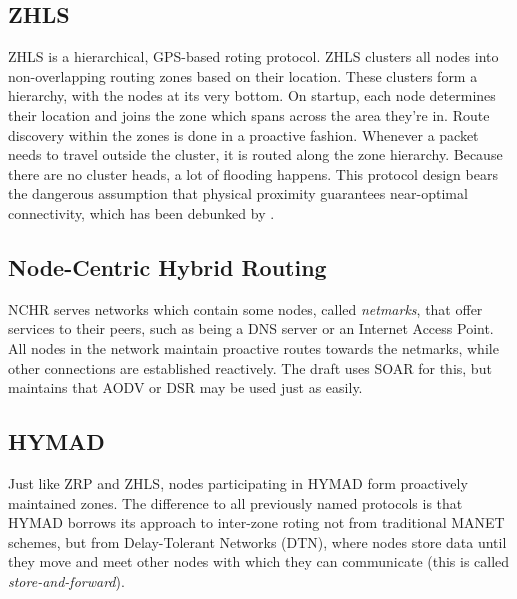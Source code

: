 \documentclass[a4paper,10pt]{scrartcl}
\begin{document}
\subsection{\gls{ZHLS}}
\label{subsec:zhls}
ZHLS is a hierarchical, GPS-based roting protocol.
ZHLS clusters all nodes into non-overlapping routing zones based on their location. These clusters form a hierarchy, with the nodes at its very bottom.
On startup, each node determines their location and joins the zone which spans across the area they're in. Route discovery within the zones is done in a proactive fashion. Whenever a packet needs to travel outside the cluster, it is routed along the zone hierarchy. Because there are no cluster heads, a lot of flooding happens. 
This protocol design bears the dangerous assumption that physical proximity guarantees near-optimal connectivity, which has been debunked by \cite{mistaken-axioms}. 

\subsection{Node-Centric Hybrid Routing}
\label{subsec:nchr}
NCHR\cite{Roy_nodecentric} serves networks which contain some nodes, called \emph{netmarks}, that offer services to their peers, such as being a DNS server or an Internet Access Point. All nodes in the network maintain proactive routes towards the netmarks, while other connections are established reactively. The draft uses SOAR\cite{SOAR} for this, but maintains that AODV\cite{RFC-3561} or DSR\cite{DSR} may be used just as easily.

\subsection{\gls{HYMAD}}
\label{subsec:hymad}
Just like ZRP and ZHLS, nodes participating in HYMAD \cite{HYMAD} form proactively maintained zones. The difference to all previously named protocols is that HYMAD borrows its approach to inter-zone roting not from traditional \gls{MANET} schemes, but from Delay-Tolerant Networks (DTN), where nodes store data until they move and meet other nodes with which they can communicate (this is called \emph{store-and-forward}).
\end{document}
